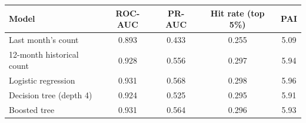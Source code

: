 \begin{tabular}{lcccc}
\hline
Model & ROC-AUC & PR-AUC & Hit rate (top 5\%) & PAI \\
\hline
Last month's count & 0.893 & 0.433 & 0.255 & 5.09 \\
12-month historical count & 0.928 & 0.556 & 0.297 & 5.94 \\
Logistic regression & 0.931 & 0.568 & 0.298 & 5.96 \\
Decision tree (depth 4) & 0.924 & 0.525 & 0.295 & 5.91 \\
Boosted tree & 0.931 & 0.564 & 0.296 & 5.93 \\
\hline
\end{tabular}
